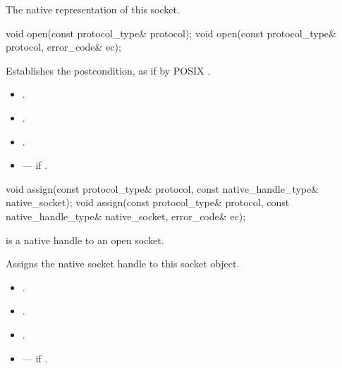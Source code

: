 \begin{itemdescr}
\pnum
\returns The native representation of this socket.
\end{itemdescr}

\begin{itemdecl}
void open(const protocol_type& protocol);
void open(const protocol_type& protocol, error_code& ec);
\end{itemdecl}

\begin{itemdescr}
\pnum
\effects Establishes the postcondition, as if by POSIX .

\pnum
\postconditions 
\begin{itemize}
\item
{}.
\item
{}.
\item
{}.
\end{itemize}

\pnum
\errors
\begin{itemize}
\item
{} --- if .
\end{itemize}
\end{itemdescr}

\begin{itemdecl}
void assign(const protocol_type& protocol,
            const native_handle_type& native_socket);
void assign(const protocol_type& protocol,
            const native_handle_type& native_socket, error_code& ec);
\end{itemdecl}

\begin{itemdescr}
\pnum
\requires {} is a native handle to an open socket.

\pnum
\effects Assigns the native socket handle to this socket object.

\pnum
\postconditions 
\begin{itemize}
\item
{}.
\item
{}.
\item
{}.
\end{itemize}

\pnum
\errors
\begin{itemize}
\item
{} --- if .
\end{itemize}
\end{itemdescr}

